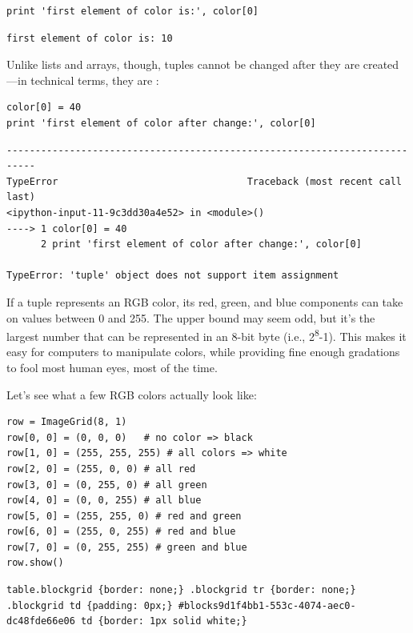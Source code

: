 \documentclass{book}
\begin{document}
\begin{verbatim}
print 'first element of color is:', color[0]
\end{verbatim}

\begin{verbatim}
first element of color is: 10
\end{verbatim}

Unlike lists and arrays, though, tuples cannot be changed after they are
created---in technical terms, they are
:

\begin{verbatim}
color[0] = 40
print 'first element of color after change:', color[0]
\end{verbatim}

\begin{verbatim}
---------------------------------------------------------------------------
TypeError                                 Traceback (most recent call last)
<ipython-input-11-9c3dd30a4e52> in <module>()
----> 1 color[0] = 40
      2 print 'first element of color after change:', color[0]

TypeError: 'tuple' object does not support item assignment
\end{verbatim}

If a tuple represents an RGB color, its red, green, and blue components
can take on values between 0 and 255. The upper bound may seem odd, but
it's the largest number that can be represented in an 8-bit byte (i.e.,
2\textsuperscript{8}-1). This makes it easy for computers to manipulate
colors, while providing fine enough gradations to fool most human eyes,
most of the time.

Let's see what a few RGB colors actually look like:

\begin{verbatim}
row = ImageGrid(8, 1)
row[0, 0] = (0, 0, 0)   # no color => black
row[1, 0] = (255, 255, 255) # all colors => white
row[2, 0] = (255, 0, 0) # all red
row[3, 0] = (0, 255, 0) # all green
row[4, 0] = (0, 0, 255) # all blue
row[5, 0] = (255, 255, 0) # red and green
row[6, 0] = (255, 0, 255) # red and blue
row[7, 0] = (0, 255, 255) # green and blue
row.show()
\end{verbatim}

\begin{verbatim}
table.blockgrid {border: none;} .blockgrid tr {border: none;} .blockgrid td {padding: 0px;} #blocks9d1f4bb1-553c-4074-aec0-dc48fde66e06 td {border: 1px solid white;}
\end{verbatim}
\end{document}
